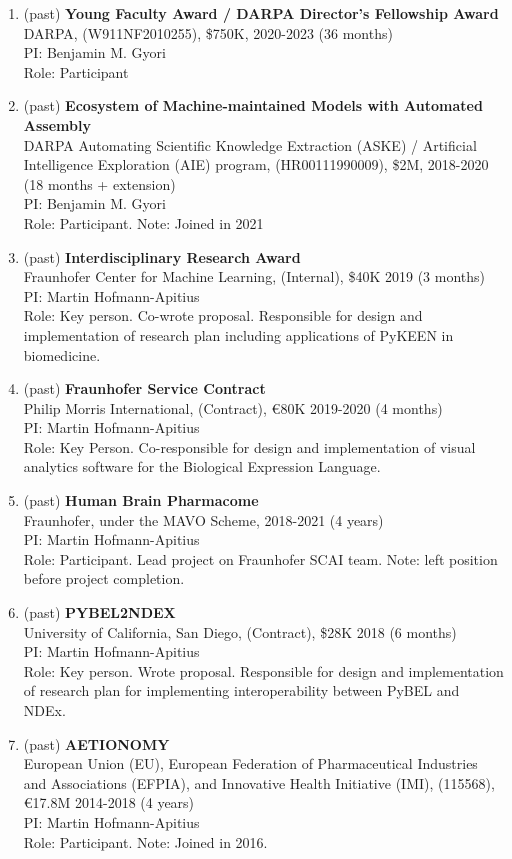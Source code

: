\documentclass[10pt,a4paper,sans]{moderncv} %
\begin{document}
\begin{enumerate}
    \item (past) \textbf{Young Faculty Award / DARPA Director’s Fellowship Award}\\
        DARPA, (W911NF2010255), \$750K, 2020-2023 (36 months)\\
        PI: Benjamin M. Gyori\\
        Role: Participant
    \item (past) \textbf{Ecosystem of Machine-maintained Models with Automated Assembly}\\
        DARPA Automating Scientific Knowledge Extraction (ASKE) / Artificial Intelligence Exploration (AIE) program, (HR00111990009), \$2M, 2018-2020 (18 months + extension)\\
        PI: Benjamin M. Gyori\\
        Role: Participant. Note: Joined in 2021
    \item (past) \textbf{Interdisciplinary Research Award}\\
        Fraunhofer Center for Machine Learning, (Internal), \$40K 2019 (3 months)\\
        PI: Martin Hofmann-Apitius\\
        Role: Key person. Co-wrote proposal. Responsible for design and implementation of research plan including applications of PyKEEN in biomedicine.
    \item (past) \textbf{Fraunhofer Service Contract}\\
        Philip Morris International, (Contract), €80K 2019-2020 (4 months)\\
        PI: Martin Hofmann-Apitius\\
        Role: Key Person. Co-responsible for design and implementation of visual analytics software for the Biological Expression Language.
    \item (past) \textbf{Human Brain Pharmacome}\\
        Fraunhofer, under the MAVO Scheme, 2018-2021 (4 years)\\
        PI: Martin Hofmann-Apitius\\
        Role: Participant.
Lead project on Fraunhofer SCAI team.
Note: left position before project completion.

    \item (past) \textbf{PYBEL2NDEX}\\
        University of California, San Diego, (Contract), \$28K 2018 (6 months)\\
        PI: Martin Hofmann-Apitius\\
        Role: Key person. Wrote proposal. Responsible for design and implementation of research plan for implementing interoperability between PyBEL and NDEx.
    \item (past) \textbf{AETIONOMY}\\
        European Union (EU), European Federation of Pharmaceutical Industries and Associations (EFPIA), and Innovative Health Initiative (IMI), (115568), €17.8M 2014-2018 (4 years)\\
        PI: Martin Hofmann-Apitius\\
        Role: Participant. 
Note: Joined in 2016.


\end{enumerate}
\end{document}
